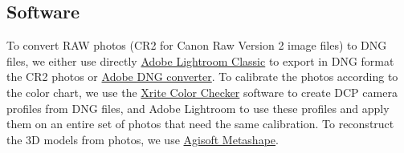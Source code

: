 \documentclass[10pt,letter,english]{article}
\begin{document}
\subsection{Software}
To convert RAW photos (CR2 for Canon Raw Version 2 image files) to DNG files, we either use directly \href{https://www.adobe.com/ca_fr/products/photoshop-lightroom-classic.html}{Adobe Lightroom Classic} to export in DNG format the CR2 photos or \href{https://helpx.adobe.com/camera-raw/using/adobe-dng-converter.html}{Adobe DNG converter}. 
To calibrate the photos according to the color chart, we use the \href{https://xritephoto.com/ph_product_overview.aspx?ID=938&Action=Support&SoftwareID=2030}{Xrite Color Checker} software to create DCP camera profiles from DNG files, and Adobe Lightroom to use these profiles and apply them on an entire set of photos that need the same calibration.
To reconstruct the 3D models from photos, we use  \href{https://www.agisoft.com/downloads/installer/}{Agisoft Metashape}.
\end{document}

